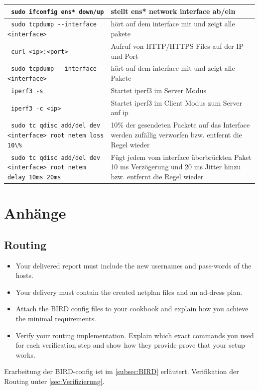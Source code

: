 \documentclass[11pt,titlepage]{article}
\newenvironment{shadedquotation}
 {\begin{shaded*}
  \quoting[leftmargin=0pt, vskip=0pt]
 }
 {\endquoting
 \end{shaded*}
}
\begin{document}
\begin{tabular}{ |p{4cm}|p{10cm}|}
  \hline
  \lstinline! sudo ifconfig ens* down/up ! & stellt ens* network interface ab/ein\\
  \hline
  \lstinline! sudo tcpdump --interface <interface> ! & hört auf dem interface mit und zeigt alle pakete\\
  \hline
  \lstinline! curl <ip>:<port> ! & Aufruf von HTTP/HTTPS Files auf der IP und Port\\
  \hline
  \lstinline! sudo tcpdump --interface <interface> ! & hört auf dem interface mit und zeigt alle Pakete\\
  \hline
  \lstinline! iperf3 -s ! & Startet iperf3 im Server Modus\\
  \hline
  \lstinline! iperf3 -c <ip> ! & Startet iperf3 im Client Modus zum Server auf ip\\
  \hline
  \lstinline! sudo tc qdisc add/del dev <interface> root netem loss 10\% ! & 10\% der gesendeten Packete auf das Interface werden zufällig verworfen bzw. entfernt die Regel wieder\\
  \hline
  \lstinline! sudo tc qdisc add/del dev <interface> root netem delay 10ms 20ms ! & Fügt jedem vom interface überbrückten Paket 10 ms Verzögerung und 20 ms Jitter hinzu bzw. entfernt die Regel wieder\\
  \hline
\end{tabular}
\newpage

\section{Anhänge}
\label{sec:Anhänge}

\subsection{Routing}
\label{subsec:Routing}
\begin{shadedquotation}
  \begin{itemize}
    \item Your delivered report must include the new usernames and pass-words of the hosts.
    \item Your delivery must contain the created netplan files and an ad-dress plan.
    \item Attach the BIRD config files to your cookbook and explain how you achieve the minimal requirements.
    \item Verify your routing implementation. Explain which exact commands you used for each verification step and show how they provide prove that your setup works.
  \end{itemize}
\end{shadedquotation}
Erarbeitung der BIRD-config ist im \ref{subsec:BIRD} erläutert.
Verifikation der Routing unter \ref{sec:Verifizierung}.
\end{document}
